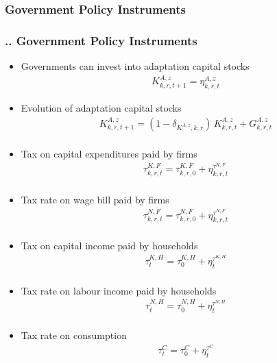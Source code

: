 \documentclass[11pt,aspectratio=169]{beamer}
\begin{document}
\subsubsection{Government Policy Instruments}
\begin{frame}
\frametitle{{\thesection.\thesubsection.\thesubsubsection} Government Policy Instruments}
\scriptsize
\begin{itemize}
\item Governments can invest into adaptation capital stocks
\begin{align*}
K^{A,z}_{k,r,t+1} = \eta^{A,z}_{k,r,t}
\end{align*}
\item Evolution of adaptation capital stocks
\begin{align*}
K^{A,z}_{k,r,t+1} = (1 - \delta_{K^{A,z},k,r}) \, K^{A,z}_{k,r,t} + G^{A,z}_{k,r,t} \nonumber \\
\end{align*}
\item Tax on capital expenditures paid by firms
\begin{align*}
\tau^{K,F}_{k,r,t} = \tau^{K,F}_{k,r,0} + \eta^{\tau^{K,F}}_{k,r,t} \nonumber \\
\end{align*}
\item Tax rate on wage bill paid by firms
\begin{align*}
\tau^{N,F}_{k,r,t} = \tau^{N,F}_{k,r,0} + \eta^{\tau^{N,F}}_{k,r,t} \nonumber \\
\end{align*}
\item Tax on capital income paid by households
\begin{align*}
\tau^{K,H}_{t} = \tau^{K,H}_{0} + \eta^{\tau^{K,H}}_{t} \nonumber \\
\end{align*}
\item Tax rate on labour income paid by households
\begin{align*}
\tau^{N,H}_{t} = \tau^{N,H}_{0} + \eta^{\tau^{N,H}}_{t} \nonumber \\
\end{align*}
\item Tax rate on consumption
\begin{align*}
\tau^{C}_{t} = \tau^{C}_{0} + \eta^{\tau^{C}}_{t} \nonumber \\
\end{align*}

\end{itemize}
\end{frame}
\end{document}
